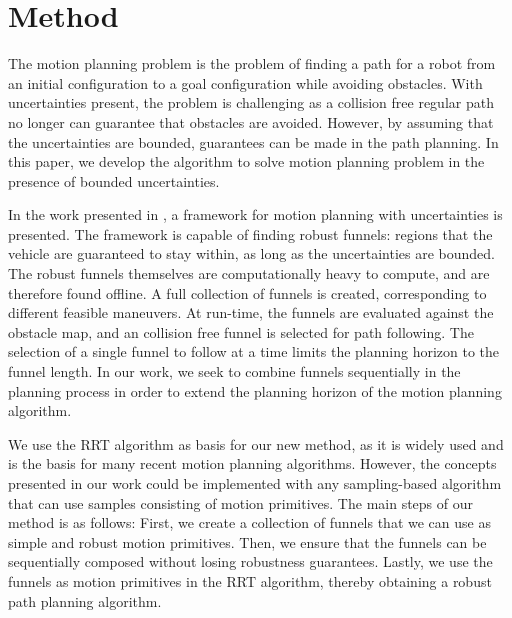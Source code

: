 

\section{Method}

The motion planning problem is the problem of finding a path for a robot from an initial configuration to a goal configuration while avoiding obstacles. 
With uncertainties present, the problem is challenging as a collision free regular path no longer can guarantee that obstacles are avoided. 
However, by assuming that the uncertainties are bounded, guarantees can be made in the path planning.
In this paper, we develop the \rrtfunnel algorithm to solve motion planning problem in the presence of bounded uncertainties.

In the work presented in \cite{majumdarFunnelLibrariesRealtime2017}, a framework for motion planning with uncertainties is presented. 
The framework is capable of finding robust funnels: regions that the vehicle are guaranteed to stay within, as long as the uncertainties are bounded.
The robust funnels themselves are computationally heavy to compute, and are therefore found offline. 
A full collection of funnels is created, corresponding to different feasible maneuvers. 
At run-time, the funnels are evaluated against the obstacle map, and an collision free funnel is selected for path following. 
The selection of a single funnel to follow at a time limits the planning horizon to the funnel length. 
In our work, we seek to combine funnels sequentially in the planning process in order to extend the planning horizon of the motion planning algorithm.


We use the RRT algorithm as basis for our new method, as it is widely used and is the basis for many recent motion planning algorithms. 
However, the concepts presented in our work could be implemented with any sampling-based algorithm that can use samples consisting of motion primitives.
The main steps of our method is as follows:
First, we create a collection of funnels that we can use as simple and robust motion primitives.
Then, we ensure that the funnels can be sequentially composed without losing robustness guarantees.
Lastly, we use the funnels as motion primitives in the RRT algorithm, thereby obtaining a robust path planning algorithm.


